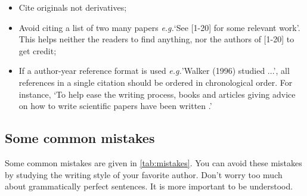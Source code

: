\documentclass[authoryear,3p,times,preprint,review,fleqn]{elsarticle}
\newcommand{\eg}{\textit{e.g.}\xspace}
\numberwithin{equation}{section}
\theoremstyle{remark}
\begin{document}
\begin{itemize}
\item Cite originals not derivatives;
\item Avoid citing a list of two many papers \eg `See [1-20] for some relevant work'. This helps neither the readers to find anything, nor the authors of [1-20] to get credit;
\item If a author-year reference format is used \eg 'Walker (1996) studied ...', all references in a single citation should be ordered in chronological order. For instance, `To help ease the writing process, books and articles giving advice on how to write scientific papers have been written \citep{day1998write,ashby2000write,plaxco2010art}.'
\end{itemize}

% 
\subsection{Some common mistakes}\label{sec:mistakes}


Some common mistakes are given in \cref{tab:mistakes}. You can avoid these mistakes by studying the writing style of your favorite author. Don't worry too much about grammatically perfect sentences. It is more important to be understood. \\
\end{document}
